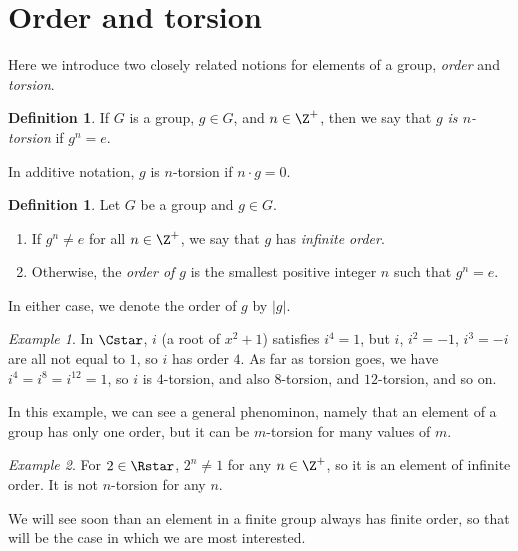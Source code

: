\documentclass[12pt]{amsart}
\theoremstyle{plain}
\theoremstyle{definition}
\newtheorem{defn}[thm]{Definition}
\theoremstyle{remark}
\newtheorem*{exam}{Example}
\begin{document}
\section{Order and torsion}
Here we introduce two closely related notions for elements of a group, \emph{order}
and \emph{torsion}.

\begin{defn}
If $G$ is a group, $g\in G$, and $n\in\Z^+$, then we say that \emph{$g$ is $n$-torsion}
if $g^n=e$.
\end{defn}
In additive notation, $g$ is $n$-torsion if $n\cdot g=0$.

\begin{defn}
  Let $G$ be a group and $g\in G$.
  \begin{enumerate}
  \item If $g^n\neq e$ for all $n\in\Z^+$, we say that $g$ has \emph{infinite order}.
  \item Otherwise, the \emph{order of $g$} is the smallest positive integer $n$ such that
  $g^n=e$.
  \end{enumerate}
  In either case, we denote the order of $g$ by $|g|$.
\end{defn}

\begin{exam}
  In $\Cstar$, $i$ (a root of $x^2+1$) satisfies $i^4=1$, but
  $i$, $i^2=-1$, $i^3=-i$ are all not equal to $1$, so $i$ has order $4$.  
  As far as torsion
  goes, we have $i^4=i^8=i^{12}=1$, so $i$ is $4$-torsion, and also 
  $8$-torsion, and $12$-torsion, and so on.
\end{exam}
In this example, we can see a general phenominon, namely that an element
of a group has only one order, but it can be $m$-torsion for many values
of $m$.

\begin{exam}
For $2\in \Rstar$, $2^n\neq 1$ for any $n\in\Z^+$, so it is an element 
of infinite order.  It is not $n$-torsion for any $n$.
\end{exam}

We will see soon than an element in a finite group always has finite order, so that will
be the case in which we are most interested.
\end{document}
